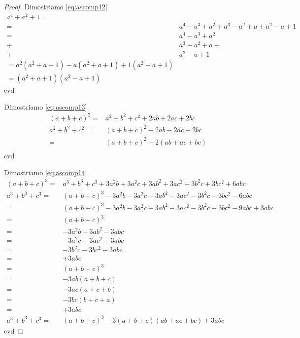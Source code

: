 \begin{proof}
Dimostriamo \ref{eq:ascomp12}
\begin{align*}
a^4+a^2+1=&\\
=&a^4-a^3+a^2+a^3-a^2+a+a^2-a+1\\
=&a^4-a^3+a^2\\
+&a^3-a^2+a+\\
+&a^2-a+1\\
=a^2(a^2+a+1)-a(a^2+a+1)+1(a^2+a+1)\\
=(a^2+a+1)(a^2-a+1)
\end{align*}
cvd

Dimostriamo \ref{eq:ascomp13}
\begin{align*}
(a+b+c)^2=&a^2+b^2+c^2+2ab+2ac+2bc\\
a^2+b^2+c^2=&(a+b+c)^2-2ab-2ac-2bc\\
=&(a+b+c)^2-2(ab+ac+bc)\\
\end{align*}
cvd

Dimostriamo \ref{eq:ascomp14}
\begin{align*}
	(a+b+c)^3=&a^3+b^3+c^3+3a^2b+3a^2c+3ab^2+3ac^2+3b^2c+3bc^2+6abc\\
	a^3+b^3+c^3=&(a+b+c)^3-3a^2b-3a^2c-3ab^2-3ac^2-3b^2c-3bc^2-6abc\\
=&(a+b+c)^3-3a^2b-3a^2c-3ab^2-3ac^2-3b^2c-3bc^2-9abc+3abc\\
=&(a+b+c)^3\\
=&-3a^2b-3ab^2-3abc\\
=&-3a^2c-3ac^2-3abc\\
=&-3b^2c-3bc^2-3abc\\
=&+3abc\\
=&(a+b+c)^3\\
=&-3ab(a+b+c)\\
=&-3ac(a+c+b)\\
=&-3bc(b+c+a)\\
=&+3abc\\
a^3+b^3+c^3=&{}(a+b+c)^3-3(a+b+c)(ab+ac+bc)+3abc
\end{align*}
cvd
\end{proof}